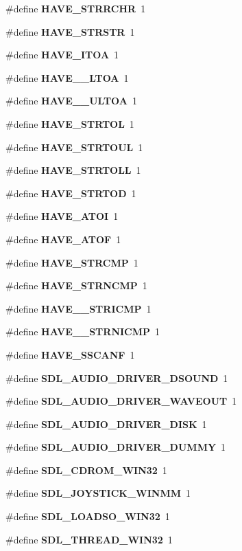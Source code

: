 \begin{DoxyCompactItemize}
\item 
\#define {\bf H\+A\+V\+E\+\_\+\+S\+T\+R\+R\+C\+H\+R}~1
\item 
\#define {\bf H\+A\+V\+E\+\_\+\+S\+T\+R\+S\+T\+R}~1
\item 
\#define {\bf H\+A\+V\+E\+\_\+\+I\+T\+O\+A}~1
\item 
\#define {\bf H\+A\+V\+E\+\_\+\+\_\+\+L\+T\+O\+A}~1
\item 
\#define {\bf H\+A\+V\+E\+\_\+\+\_\+\+U\+L\+T\+O\+A}~1
\item 
\#define {\bf H\+A\+V\+E\+\_\+\+S\+T\+R\+T\+O\+L}~1
\item 
\#define {\bf H\+A\+V\+E\+\_\+\+S\+T\+R\+T\+O\+U\+L}~1
\item 
\#define {\bf H\+A\+V\+E\+\_\+\+S\+T\+R\+T\+O\+L\+L}~1
\item 
\#define {\bf H\+A\+V\+E\+\_\+\+S\+T\+R\+T\+O\+D}~1
\item 
\#define {\bf H\+A\+V\+E\+\_\+\+A\+T\+O\+I}~1
\item 
\#define {\bf H\+A\+V\+E\+\_\+\+A\+T\+O\+F}~1
\item 
\#define {\bf H\+A\+V\+E\+\_\+\+S\+T\+R\+C\+M\+P}~1
\item 
\#define {\bf H\+A\+V\+E\+\_\+\+S\+T\+R\+N\+C\+M\+P}~1
\item 
\#define {\bf H\+A\+V\+E\+\_\+\+\_\+\+S\+T\+R\+I\+C\+M\+P}~1
\item 
\#define {\bf H\+A\+V\+E\+\_\+\+\_\+\+S\+T\+R\+N\+I\+C\+M\+P}~1
\item 
\#define {\bf H\+A\+V\+E\+\_\+\+S\+S\+C\+A\+N\+F}~1
\item 
\#define {\bf S\+D\+L\+\_\+\+A\+U\+D\+I\+O\+\_\+\+D\+R\+I\+V\+E\+R\+\_\+\+D\+S\+O\+U\+N\+D}~1
\item 
\#define {\bf S\+D\+L\+\_\+\+A\+U\+D\+I\+O\+\_\+\+D\+R\+I\+V\+E\+R\+\_\+\+W\+A\+V\+E\+O\+U\+T}~1
\item 
\#define {\bf S\+D\+L\+\_\+\+A\+U\+D\+I\+O\+\_\+\+D\+R\+I\+V\+E\+R\+\_\+\+D\+I\+S\+K}~1
\item 
\#define {\bf S\+D\+L\+\_\+\+A\+U\+D\+I\+O\+\_\+\+D\+R\+I\+V\+E\+R\+\_\+\+D\+U\+M\+M\+Y}~1
\item 
\#define {\bf S\+D\+L\+\_\+\+C\+D\+R\+O\+M\+\_\+\+W\+I\+N32}~1
\item 
\#define {\bf S\+D\+L\+\_\+\+J\+O\+Y\+S\+T\+I\+C\+K\+\_\+\+W\+I\+N\+M\+M}~1
\item 
\#define {\bf S\+D\+L\+\_\+\+L\+O\+A\+D\+S\+O\+\_\+\+W\+I\+N32}~1
\item 
\#define {\bf S\+D\+L\+\_\+\+T\+H\+R\+E\+A\+D\+\_\+\+W\+I\+N32}~1

\end{DoxyCompactItemize}

